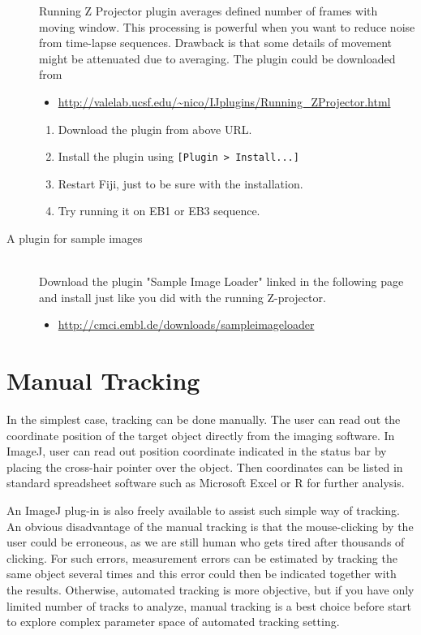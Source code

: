 \documentclass[11pnt]{article}
\begin{document}
\begin{description}
Running Z Projector plugin averages defined number of frames with moving window. This processing is powerful when you want to reduce noise from time-lapse sequences. Drawback is that some details of movement might be attenuated due to averaging. The plugin could be downloaded from
\begin{itemize}
\item\url{http://valelab.ucsf.edu/~nico/IJplugins/Running_ZProjector.html}
\end{itemize}
\begin{enumerate}
\item Download the plugin from above URL.
\item Install the plugin using \verb"[Plugin > Install...]"
\item Restart Fiji, just to be sure with the installation. 
\item Try running it on EB1 or EB3 sequence. 
\end{enumerate}

\item[A plugin for sample images]\hfill\\

Download the plugin "Sample Image Loader" linked in the following page and install just like you did with the running Z-projector. 
\begin{itemize}
\item\url{http://cmci.embl.de/downloads/sampleimageloader}
\end{itemize}

\end{description}

\section{Manual Tracking}

In the simplest case, tracking can be done manually. The user can read
out the coordinate position of the target object directly from the
imaging software. In ImageJ, user can read out position coordinate
indicated in the status bar by placing the cross-hair pointer over the
object. Then coordinates can be listed in standard spreadsheet software
such as Microsoft Excel or R for further analysis. 

An ImageJ plug-in is also freely available to assist such simple way of
tracking. An obvious disadvantage of the manual tracking is that the
mouse-clicking by the user could be erroneous, as we are still human
who gets tired after thousands of clicking. For such errors,
measurement errors can be estimated by tracking the same object several
times and this error could then be indicated together with the results.
Otherwise, automated tracking is more objective, but if you have only
limited number of tracks to analyze, manual tracking is a best choice
before start to explore complex parameter space of automated tracking
setting.
\end{document}
